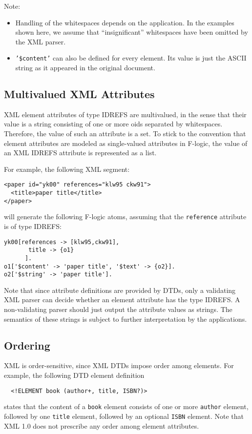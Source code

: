 Note:
\begin{itemize}
\item Handling of the whitespaces depends on the application. In the
  examples shown here, we assume that
  ``insignificant'' whitespaces have been omitted by the XML parser.
\item {\tt '\$content'}  can also be defined for every element. Its value is
    just the ASCII string as it appeared in the original document.
\end{itemize}

\subsection{Multivalued XML Attributes}

XML element attributes of type IDREFS are multivalued, in the sense
that their value is a string consisting of one or more oids separated
by whitespaces. Therefore, the value of such an attribute is a set. To
stick to the convention that element attributes are modeled as
single-valued attributes in F-logic, the value of an XML IDREFS
attribute is represented as a list.

For example, the following XML segment:
\begin{verbatim}
<paper id="yk00" references="klw95 ckw91">
  <title>paper title</title>
</paper>
\end{verbatim}
will generate the following F-logic atoms, assuming that the
{\tt reference}  attribute is of type IDREFS:
\begin{verbatim}
yk00[references -> [klw95,ckw91],
       title -> {o1}
      ].
o1['$content' -> 'paper title', '$text' -> {o2}].
o2['$string' -> 'paper title'].
\end{verbatim}
Note that since attribute definitions are provided by DTDs, only a
validating XML parser can decide whether an element attribute has the type
IDREFS.  A non-validating parser should just output the attribute values as
strings. The semantics of these strings is subject to further
interpretation by the applications.


\subsection{Ordering}

XML is order-sensitive, since XML DTDs impose order among elements.
For example, the following DTD element definition
\begin{verbatim}
  <!ELEMENT book (author+, title, ISBN?)> 
\end{verbatim}
states that the content of a {\tt book}  element consists of one or more
{\tt author}  element, followed by one {\tt title}  element, followed by an
optional {\tt ISBN}  element.
Note that XML 1.0 does not prescribe any order among element attributes.

